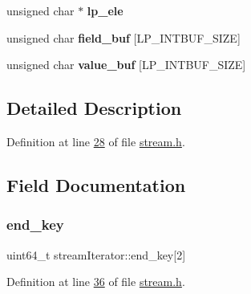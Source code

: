 \begin{DoxyCompactItemize}
\item 
\mbox{\label{structstreamIterator_a0312badd5369a7d5062361e8e54e0269}} 
unsigned char $\ast$ {\bfseries lp\+\_\+ele}
\item 
\mbox{\label{structstreamIterator_a5b72cdb1785d955fe0c619863d5f4733}} 
unsigned char {\bfseries field\+\_\+buf} \mbox{[}L\+P\+\_\+\+I\+N\+T\+B\+U\+F\+\_\+\+S\+I\+ZE\mbox{]}
\item 
\mbox{\label{structstreamIterator_af9077b7f2023f9dc82855dfd9e9d4f89}} 
unsigned char {\bfseries value\+\_\+buf} \mbox{[}L\+P\+\_\+\+I\+N\+T\+B\+U\+F\+\_\+\+S\+I\+ZE\mbox{]}
\end{DoxyCompactItemize}


\subsection{Detailed Description}


Definition at line \hyperlink{stream_8h_source_l00028}{28} of file \hyperlink{stream_8h_source}{stream.\+h}.



\subsection{Field Documentation}
\mbox{\label{structstreamIterator_a36a57435248ae3f7c858b8aa74818f2e}} 
\subsubsection{\texorpdfstring{end\+\_\+key}{end\_key}}
{\footnotesize\ttfamily uint64\+\_\+t stream\+Iterator\+::end\+\_\+key\mbox{[}2\mbox{]}}



Definition at line \hyperlink{stream_8h_source_l00036}{36} of file \hyperlink{stream_8h_source}{stream.\+h}.

\mbox{\label{structstreamIterator_abd54a07f59d43756fc96c696cadf9210}} 
